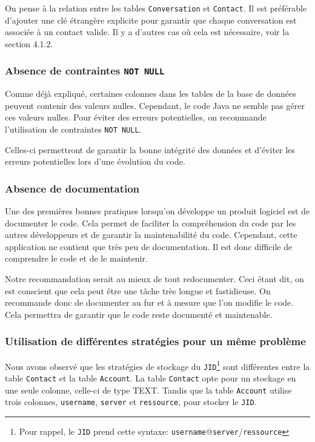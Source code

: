 \documentclass[a4paper,11pt]{article}
\begin{document}
On pense à la relation entre les tables \texttt{Conversation} et \texttt{Contact}. Il est préférable d'ajouter une clé étrangère explicite pour garantir que chaque conversation est associée à un contact valide. Il y a d'autres cas où cela est nécessaire, voir la section 4.1.2.

\subsubsection*{Absence de contraintes \texttt{NOT NULL}}

Comme déjà expliqué, certaines colonnes dans les tables de la base de données peuvent contenir des valeurs nulles. Cependant, le code Java ne semble pas gérer ces valeurs nulles. Pour éviter des erreurs potentielles, on recommande l'utilisation de contraintes \texttt{NOT NULL}.

Celles-ci permettront de garantir la bonne intégrité des données et d'éviter les erreurs potentielles lors d'une évolution du code.

\subsubsection*{Absence de documentation}

Une des premières bonnes pratiques lorsqu'on développe un produit logiciel est de documenter le code. Cela permet de faciliter la compréhension du code par les autres développeurs et de garantir la maintenabilité du code. Cependant, cette application ne contient que très peu de documentation. Il est donc difficile de comprendre le code et de le maintenir.

Notre recommandation serait  au mieux de tout redocumenter. Ceci étant dit, on est conscient que cela peut être une tâche très longue et fastidieuse. On recommande donc de documenter au fur et à mesure que l'on modifie le code. Cela permettra de garantir que le code reste documenté et maintenable.

\subsubsection*{Utilisation de différentes stratégies pour un même problème}

Nous avons observé que les stratégies de stockage du \texttt{JID}\footnote{Pour rappel, le \texttt{JID} prend cette syntaxe: \texttt{username}@\texttt{server}/\texttt{ressource}} sont différentes entre la table \texttt{Contact} et la table \texttt{Account}. La table \texttt{Contact} opte pour un stockage en une seule colonne, celle-ci de type TEXT. Tandis que la table \texttt{Account} utilise trois colonnes, \texttt{username}, \texttt{server} et \texttt{ressource}, pour stocker le \texttt{JID}.
\end{document}
